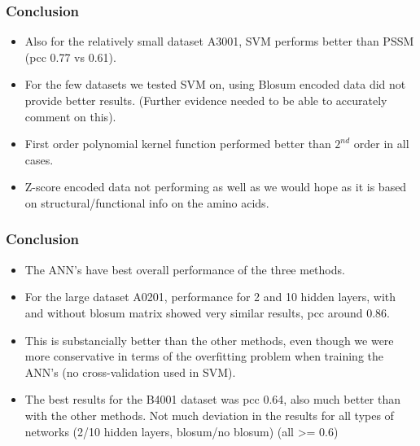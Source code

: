 \documentclass[presentation]{beamer}   %
\begin{document}
\begin{frame}
\frametitle{Conclusion}
\begin{itemize}
\item Also for the relatively small dataset A3001, SVM performs better than PSSM (pcc 0.77 vs 0.61). \pause
\item For the few datasets we tested SVM on, using Blosum encoded data did not provide better results. (Further evidence needed to be able to accurately comment on this). \pause
\item First order polynomial kernel function performed better than $2^{nd}$ order in all cases. \pause
\item Z-score encoded data not performing as well as we would hope as it is based on structural/functional info on the amino acids.
\end{itemize}
\end{frame}

\begin{frame}
\frametitle{Conclusion}

\begin{itemize}
\item The ANN's have best overall performance of the three methods. \pause
\item For the large dataset A0201, performance for 2 and 10 hidden layers, with and without blosum matrix showed very similar results, pcc around 0.86. \pause
\item This is substancially better than the other methods, even though we were more conservative in terms of the overfitting problem when training the ANN's (no cross-validation used in SVM). \pause
\item The best results for the B4001 dataset was pcc 0.64, also much better than with the other methods. Not much deviation in the results for all types of networks (2/10 hidden layers, blosum/no blosum) (all >= 0.6) 
\end{itemize}
\end{frame}
\end{document}
